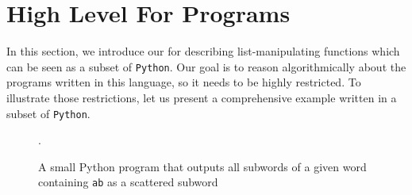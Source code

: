\section{High Level For Programs}
\label{sec:high_level}

\AP In this section, we introduce our  for
describing list-manipulating functions which can be seen as a subset of
\texttt{Python}. Our goal is to reason algorithmically about the
programs written in this language, so it needs to be highly restricted.
To illustrate those restrictions, let us present a comprehensive
example written in a subset of \texttt{Python}. 

\begin{figure}[h]
    \centering
    
    \caption{A small Python program that
        outputs all subwords of a given word containing \texttt{ab}
        as a scattered subword}.
    \label{fig:python-example-nested}
\end{figure}

